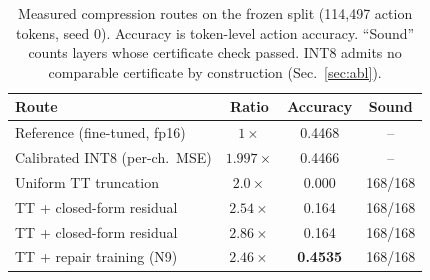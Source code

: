 \documentclass[conference,10pt]{IEEEtran}
\begin{document}
\begin{table}[t]
\centering
\caption{Measured compression routes on the frozen split
(114{,}497 action tokens, seed 0). Accuracy is token-level action accuracy.
``Sound'' counts layers whose certificate check passed. INT8 admits no
comparable certificate by construction (Sec.~\ref{sec:abl}).}
\label{tab:main}
\begin{tabular}{@{}lccc@{}}
\toprule
Route & Ratio & Accuracy & Sound \\
\midrule
Reference (fine-tuned, fp16) & $1\times$      & 0.4468 & -- \\
Calibrated INT8 (per-ch.\ MSE) & $1.997\times$ & 0.4466 & -- \\
Uniform TT truncation         & $2.0\times$   & 0.000  & 168/168 \\
TT + closed-form residual     & $2.54\times$  & 0.164  & 168/168 \\
TT + closed-form residual     & $2.86\times$  & 0.164  & 168/168 \\
TT + repair training (N9)     & $2.46\times$  & \textbf{0.4535} & 168/168 \\
\bottomrule
\end{tabular}
\end{table}
\end{document}
